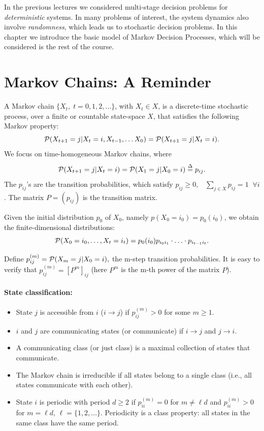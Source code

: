 
In the previous lectures we considered multi-stage decision problems for \emph{deterministic} systems. In many problems of interest, the system dynamics also involve \emph{randomness}, which leads us to stochastic decision problems. In this chapter we introduce the basic model of Markov Decision Processes, which will be considered is the rest of the course.
%

\section{Markov Chains: A Reminder}

A Markov chain $\{ {X_t},\;t = 0,1,2, \ldots \} $, with ${X_t} \in X$, is a discrete-time stochastic process, over a finite or countable state-space $X$, that satisfies the following Markov property:
	\[{\cal P}({X_{t + 1}} = j|{X_t} = i,{X_{t - 1}}, \ldots {X_0}) = {\cal P}({X_{t + 1}} = j|{X_t} = i).\]
We focus on time-homogeneous Markov chains, where
\[{\cal P}({X_{t + 1}} = j|{X_t} = i) = {\cal P}({X_1} = j|{X_0} = i) \buildrel \Delta \over = {p_{ij}}.\]
The ${p_{ij}}$'s  are the transition probabilities, which satisfy
${p_{ij}} \ge 0,\;\;\;\sum\nolimits_{j \in X} {{p_{ij}} = 1\;\;\forall i} $.
The matrix $P = ({p_{ij}})$ is the transition matrix.

Given the initial distribution ${p_0}$ of ${X_0}$, namely $p({X_0} = i_0) = {p_0}(i_0)$, we obtain the finite-dimensional distributions:
\[{\cal P}({X_0} = {i_0}, \ldots ,{X_t} = {i_t}) = {p_0}(i_0){p_{{i_0}{i_1}}} \cdot  \ldots  \cdot {p_{{i_{t - 1}}{i_t}}}.\]

Define $p_{ij}^{(m)} = {\cal P}({X_m} = j|{X_0} = i),$ the m-step transition probabilities.  It is easy to verify that $p_{ij}^{(m)} = {[{P^m}]_{ij}}$  (here ${P^m}$ is the m-th power of the matrix $P$).

\paragraph{State classification:}
\begin{itemize}
\item State $j$ is accessible from $i$  ($i \to j$) if $p_{ij}^{(m)} > 0$ for some $m \ge 1$.
\item $i$ and $j$ are communicating states (or communicate) if $i \to j$ and $j \to i$.
\item A communicating class (or just class) is a maximal collection of states that communicate.
\item The Markov chain is irreducible if all states belong to a single class (i.e., all states communicate with each other).
\item State $i$ is periodic with period $d \ge 2$ if  $p_{ii}^{(m)} = 0$ for $m \ne \ell d$ and  $p_{ii}^{(m)} > 0$ for $m = \ell d$, $\ell = \{ 1,2, \ldots \}$. Periodicity is a class property: all states in the same class have the same period.
\end{itemize}

